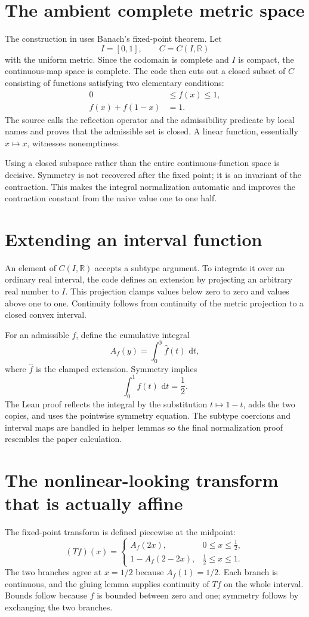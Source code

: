 \documentclass[11pt,oneside]{report}
\theoremstyle{definition}
\theoremstyle{remark}
\DeclareRobustCommand{\file}[1]{\texorpdfstring{\texttt{\expandafter\seqsplit\expandafter{\detokenize{#1}}}}{\detokenize{#1}}}
\newcommand{\R}{\mathbb{R}}
\newcommand{\dd}{\,\mathrm{d}}
\begin{document}
\section{The ambient complete metric space}
The construction in \file{Existence.lean} uses Banach's fixed-point theorem.  Let
\[
  I=[0,1],
  \qquad
  C=C(I,\R)
\]
with the uniform metric.  Since the codomain is complete and \(I\) is compact, the continuous-map space is complete.  The code then cuts out a closed subset of \(C\) consisting of functions satisfying two elementary conditions:
\begin{align*}
  0&\leq f(x)\leq1,\\
  f(x)+f(1-x)&=1.
\end{align*}
The source calls the reflection operator and the admissibility predicate by local names and proves that the admissible set is closed.  A linear function, essentially \(x\mapsto x\), witnesses nonemptiness.

Using a closed subspace rather than the entire continuous-function space is decisive.  Symmetry is not recovered after the fixed point; it is an invariant of the contraction.  This makes the integral normalization automatic and improves the contraction constant from the naive value one to one half.

\section{Extending an interval function}
An element of \(C(I,\R)\) accepts a subtype argument.  To integrate it over an ordinary real interval, the code defines an extension by projecting an arbitrary real number to \(I\).  This projection clamps values below zero to zero and values above one to one.  Continuity follows from continuity of the metric projection to a closed convex interval.

For an admissible \(f\), define the cumulative integral
\[
  A_f(y)=\int_0^y \widehat f(t)\,\dd t,
\]
where \(\widehat f\) is the clamped extension.  Symmetry implies
\[
  \int_0^1 f(t)\,\dd t=\frac12.
\]
The Lean proof reflects the integral by the substitution \(t\mapsto1-t\), adds the two copies, and uses the pointwise symmetry equation.  The subtype coercions and interval maps are handled in helper lemmas so the final normalization proof resembles the paper calculation.

\section{The nonlinear-looking transform that is actually affine}
The fixed-point transform is defined piecewise at the midpoint:
\[
  (Tf)(x)=
  \begin{cases}
    A_f(2x),&0\leq x\leq\tfrac12,\\[2mm]
    1-A_f(2-2x),&\tfrac12\leq x\leq1.
  \end{cases}
\]
The two branches agree at \(x=1/2\) because \(A_f(1)=1/2\).  Each branch is continuous, and the gluing lemma supplies continuity of \(Tf\) on the whole interval.  Bounds follow because \(f\) is bounded between zero and one; symmetry follows by exchanging the two branches.
\end{document}
